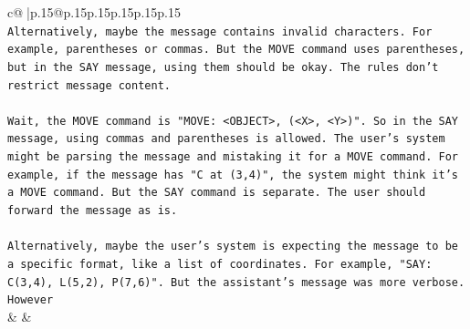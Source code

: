 \documentclass{article}
\begin{document}
{\begin{supertabular}{c@{$\;$}|p{.15\linewidth}@{}p{.15\linewidth}p{.15\linewidth}p{.15\linewidth}p{.15\linewidth}p{.15\linewidth}}
{{{\\ 
\texttt{Alternatively, maybe the message contains invalid characters. For example, parentheses or commas. But the MOVE command uses parentheses, but in the SAY message, using them should be okay. The rules don't restrict message content.} \\
\\ 
\texttt{Wait, the MOVE command is "MOVE: <OBJECT>, (<X>, <Y>)". So in the SAY message, using commas and parentheses is allowed. The user's system might be parsing the message and mistaking it for a MOVE command. For example, if the message has "C at (3,4)", the system might think it's a MOVE command. But the SAY command is separate. The user should forward the message as is.} \\
\\ 
\texttt{Alternatively, maybe the user's system is expecting the message to be a specific format, like a list of coordinates. For example, "SAY: C(3,4), L(5,2), P(7,6)". But the assistant's message was more verbose. However} \\
            }
        }
    }
    & & \\ \\


\end{supertabular}}
\end{document}
